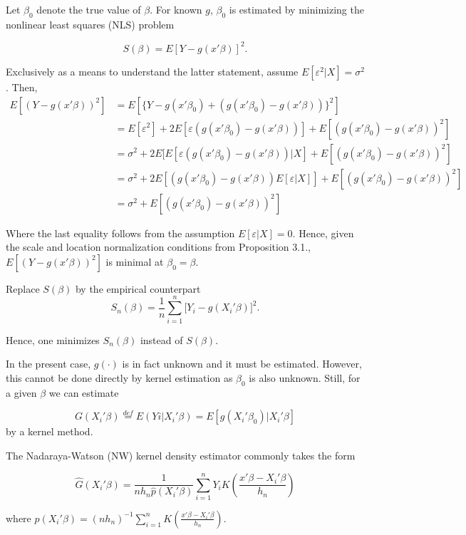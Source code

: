 \documentclass[a4paper]{article}
\begin{document}
Let $\beta_0$ denote the true value of $\beta$. For known $g$, $\beta_0$ is estimated by minimizing the nonlinear least squares (NLS) problem

\[
S(\beta) = E[Y - g(x'\beta)]^2. \]

Exclusively as a means to understand the latter statement, assume $E[\varepsilon^2|X]=\sigma^2$. Then,
\begin{align*}
E[(Y - g(x'\beta))^2] & = E[\{Y - g(x'\beta_0) + (g(x'\beta_0) - g(x'\beta))\}^2]\\
                   & = E[\varepsilon^2] + 2E[\varepsilon (g(x'\beta_0) - g(x'\beta)) ] + E[(g(x'\beta_0) - g(x'\beta))^2]\\                 & = \sigma^2 + 2E[E[\varepsilon (g(x'\beta_0) - g(x'\beta))|X] + E[(g(x'\beta_0) - g(x'\beta))^2]  \\
                   &= \sigma^2 + 2E[(g(x'\beta_0) - g(x'\beta))E[\varepsilon|X]] + E[(g(x'\beta_0) - g(x'\beta))^2] \\
                   &= \sigma^2 + E[(g(x'\beta_0) - g(x'\beta))^2]
\end{align*}

Where the last equality follows from the assumption $E[\varepsilon|X]=0$. Hence, given the scale and location normalization conditions from Proposition 3.1., $E[(Y - g(x'\beta))^2]$ is minimal at $\beta_0 = \beta$.

Replace $S(\beta)$ by the empirical counterpart 
\begin{equation}
S_n(\beta) = \frac{1}{n}\sum_{i = 1}^n\big[Y_i - g(X_i'\beta)\big]^2.
\end{equation}

Hence, one minimizes $S_n(\beta)$ instead of $S(\beta)$.


In the present case, $g(\cdot)$ is in fact unknown and it must be estimated. However, this cannot be done directly by kernel estimation as $\beta_0$ is also unknown. Still, for a given $\beta$ we can estimate

\begin{equation}
G(X_i'\beta) \stackrel{def}{=} E(Yi|X_i'\beta) = E[g(X_i'\beta_0)|X_i'\beta]
\end{equation}
 by a kernel method. 

The Nadaraya-Watson (NW) kernel density estimator commonly takes the form

\[\hat{G}(X_i'\beta) = \frac{1}{nh_n\hat{p}(X_i'\beta)}\sum_{i=1}^{n}  Y_iK \left(\frac{x'\beta - X_i'\beta}{h_n}\right) \]

where $\hat{p}(X_i'\beta) = (nh_n)^{-1}\sum_{i=1}^{n}K\left(\frac{x'\beta - X_i'\beta}{h_n}\right)$.
\end{document}
